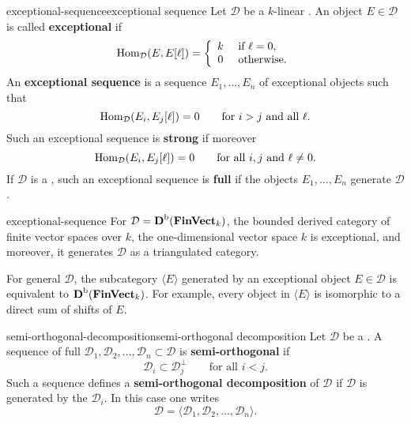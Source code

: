 \begin{topic}{exceptional-sequence}{exceptional sequence}
    Let $\mathcal{D}$ be a $k$-linear . An object $E \in \mathcal{D}$ is called \textbf{exceptional} if
    \[ \text{Hom}_\mathcal{D}(E, E[\ell]) = \left\{\begin{array}{cl} k & \text{ if } \ell = 0, \\ 0 & \text{ otherwise.} \end{array}\right. \]
    An \textbf{exceptional sequence} is a sequence $E_1, \ldots, E_n$ of exceptional objects such that
    \[ \text{Hom}_\mathcal{D}(E_i, E_j[\ell]) = 0 \qquad \textup{for $i > j$ and all $\ell$}. \]
    Such an exceptional sequence is \textbf{strong} if moreover
    \[ \text{Hom}_\mathcal{D}(E_i, E_j[\ell]) = 0 \qquad \textup{for all $i, j$ and $\ell \ne 0$}. \]
    If $\mathcal{D}$ is a , such an exceptional sequence is \textbf{full} if the objects $E_1, \ldots, E_n$ generate $\mathcal{D}$.
\end{topic}


\begin{example}{exceptional-sequence}
    For $\mathcal{D} = \textbf{D}^\textup{b}(\textbf{FinVect}_k)$, the bounded derived category of finite vector spaces over $k$, the one-dimensional vector space $k$ is exceptional, and moreover, it generates $\mathcal{D}$ as a triangulated category.

    For general $\mathcal{D}$, the subcategory $\langle E \rangle$ generated by an exceptional object $E \in \mathcal{D}$ is equivalent to $\textbf{D}^\textup{b}(\textbf{FinVect}_k)$. For example, every object in $\langle E \rangle$ is isomorphic to a direct sum of shifts of $E$.
\end{example}

\begin{topic}{semi-orthogonal-decomposition}{semi-orthogonal decomposition}
    Let $\mathcal{D}$ be a . A sequence of full   $\mathcal{D}_1, \mathcal{D}_2, \ldots, \mathcal{D}_n \subset \mathcal{D}$ is \textbf{semi-orthogonal} if
    \[ \mathcal{D}_i \subset \mathcal{D}_j^\perp \qquad \text{for all $i < j$}. \]
    Such a sequence defines a \textbf{semi-orthogonal decomposition} of $\mathcal{D}$ if $\mathcal{D}$ is generated by the $\mathcal{D}_i$. In this case one writes
    \[ \mathcal{D} = \langle \mathcal{D}_1, \mathcal{D}_2, \ldots, \mathcal{D}_n \rangle . \]
\end{topic}

